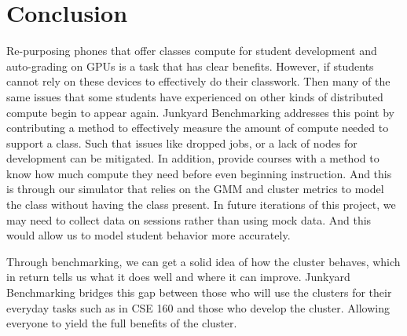 \documentclass[acmlarge]{acmart}
\begin{document}
\section{Conclusion}
Re-purposing phones that offer classes compute for student development and auto-grading on GPUs is a task that has clear benefits. However, if students cannot rely on these devices to effectively do their classwork. Then many of the same issues that some students have experienced on other kinds of distributed compute begin to appear again. Junkyard Benchmarking addresses this point by contributing a method to effectively measure the amount of compute needed to support a class. Such that issues like dropped jobs, or a lack of nodes for development can be mitigated. In addition, provide courses with a method to know how much compute they need before even beginning instruction. And this is through our simulator that relies on the GMM and cluster metrics to model the class without having the class present. In future iterations of this project, we may need to collect data on sessions rather than using mock data. And this would allow us to model student behavior more accurately. 

Through benchmarking, we can get a solid idea of how the cluster behaves, which in return tells us what it does well and where it can improve. Junkyard Benchmarking bridges this gap between those who will use the clusters for their everyday tasks such as in CSE 160 and those who develop the cluster. Allowing everyone to yield the full benefits of the cluster.  



\end{document}
